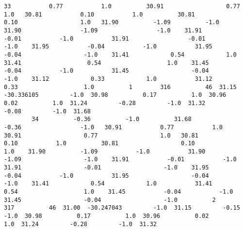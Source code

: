 \documentclass[11pt]{article}
\begin{document}
\begin{Verbatim}[commandchars=\\\{\}]
        33           0.77           1.0          30.91                  0.77                  1.0   30.81           0.10           1.0          30.81                  0.10                  1.0   31.90          -1.09          -1.0          31.90                 -1.09                 -1.0    31.91          -0.01           -1.0           31.91                 -0.01                  -1.0    31.95           -0.04           -1.0           31.95                  -0.04                  -1.0    31.41            0.54            1.0           31.41                   0.54                   1.0    31.45           -0.04           -1.0           31.45                  -0.04                  -1.0    31.12            0.33            1.0           31.12                   0.33                   1.0          1        316          46  31.15  -30.336105         -1.0  30.98          0.17          1.0  30.96          0.02          1.0  31.24         -0.28         -1.0  31.32         -0.08         -1.0  31.68   
        34          -0.36          -1.0          31.68                 -0.36                 -1.0   30.91           0.77           1.0          30.91                  0.77                  1.0   30.81           0.10           1.0          30.81                  0.10                  1.0    31.90          -1.09           -1.0           31.90                 -1.09                  -1.0    31.91           -0.01           -1.0           31.91                  -0.01                  -1.0    31.95           -0.04           -1.0           31.95                  -0.04                  -1.0    31.41            0.54            1.0           31.41                   0.54                   1.0    31.45           -0.04           -1.0           31.45                  -0.04                  -1.0          2        317          46  31.00  -30.247043         -1.0  31.15         -0.15         -1.0  30.98          0.17          1.0  30.96          0.02          1.0  31.24         -0.28         -1.0  31.32   
        

\end{Verbatim}
\end{document}
